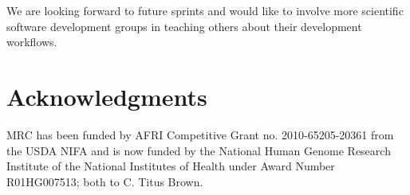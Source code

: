 \documentclass[11pt]{article}
\begin{document}
We are looking forward to future sprints and would like to involve more
scientific software development groups in teaching others about their
development workflows.



\section*{Acknowledgments}

MRC has been funded by AFRI Competitive Grant no. 2010-65205-20361
from the USDA NIFA and is now funded by the National Human Genome
Research Institute of the National Institutes of Health under Award
Number R01HG007513; both to C. Titus Brown.



\end{document}
